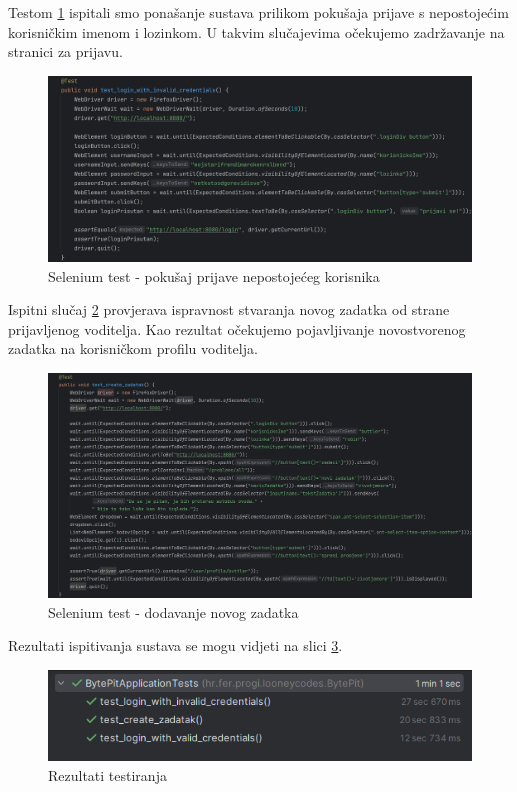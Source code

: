Testom \ref{fig:selenium2} ispitali smo ponašanje sustava prilikom pokušaja prijave s nepostojećim korisničkim imenom i lozinkom. U takvim slučajevima očekujemo zadržavanje na stranici za prijavu.

\begin{figure}[H]
	\includegraphics[scale=0.16]{slike/selenium_test2.png}
	\centering
	\caption{Selenium test - pokušaj prijave nepostojećeg korisnika}
	\label{fig:selenium2}
\end{figure}
\pagebreak
Ispitni slučaj \ref{fig:selenium3} provjerava ispravnost stvaranja novog zadatka od strane prijavljenog voditelja. Kao rezultat očekujemo pojavljivanje novostvorenog zadatka na korisničkom profilu voditelja.

\begin{figure}[H]
	\includegraphics[scale=0.14]{slike/selenium_test3.png}
	\centering
	\caption{Selenium test - dodavanje novog zadatka}
	\label{fig:selenium3}
\end{figure}

\noindent Rezultati ispitivanja sustava se mogu vidjeti na slici \ref{fig:selenium_rezultati}.

\begin{figure}[H]
	\includegraphics[scale=0.8]{slike/selenium_reultati.png}
	\centering
	\caption{Rezultati testiranja}
	\label{fig:selenium_rezultati}
\end{figure}


